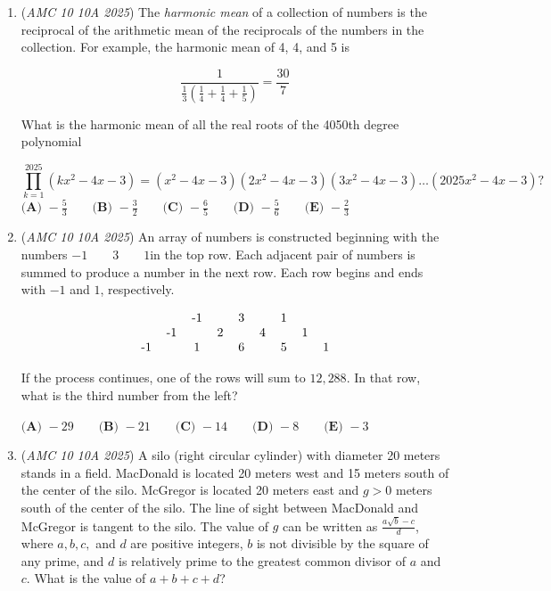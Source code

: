 \begin{enumerate}
 $\textbf{(A) } 0 \qquad\textbf{(B) } 1 \qquad\textbf{(C) } 2 \qquad\textbf{(D) } 3 \qquad\textbf{(E) } 4$


	\item (\textit{AMC 10 10A 2025}) The \textit{harmonic mean} of a collection of numbers is the reciprocal of the arithmetic mean of the reciprocals of the numbers in the collection. For example, the harmonic mean of 4, 4, and 5 is 


 
 \[\frac{1}{\frac{1}{3}(\frac{1}{4}+\frac{1}{4}+\frac{1}{5})}=\frac{30}{7}\]


 What is the harmonic mean of all the real roots of the 4050th degree polynomial


 
 \[\prod_{k=1}^{2025} (kx^2-4x-3) = (x^2-4x-3)(2x^2-4x-3)(3x^2-4x-3)\dots (2025x^2-4x-3) ?\]
$\textbf{(A) } -\frac{5}{3} \qquad\textbf{(B) } -\frac{3}{2} \qquad\textbf{(C) } -\frac{6}{5} \qquad\textbf{(D) } -\frac{5}{6} \qquad\textbf{(E) } -\frac{2}{3}$


	\item (\textit{AMC 10 10A 2025}) An array of numbers is constructed beginning with the numbers 
$-1\qquad3\qquad1$in the top row. Each adjacent pair of numbers is summed to produce a number in the next row. Each row begins and ends with 
$-1$ and $1$, respectively.


 
 \[\begin{tabular}{ccccccccc} &&-1&&3&&1&&\\ &-1&&2&&4&&1&\\ -1&&1&&6&&5&&1\\ \end{tabular}\]


 If the process continues, one of the rows will sum to $12,288$. In that row, what is the third number from the left?


 $\textbf{(A) } -29 \qquad\textbf{(B) } -21 \qquad\textbf{(C) } -14 \qquad\textbf{(D) } -8 \qquad\textbf{(E) } -3$


	\item (\textit{AMC 10 10A 2025}) A silo (right circular cylinder) with diameter 20 meters stands in a field. MacDonald is located 20 meters west and 15 meters south of the center of the silo. McGregor is located 20 meters east and $g > 0$ meters south of the center of the silo. The line of sight between MacDonald and McGregor is tangent to the silo. The value of $g$ can be written as $\frac{a\sqrt{b}-c}{d}$, where $a,b,c,$ and $d$ are positive integers, $b$ is not divisible by the square of any prime, and $d$ is relatively prime to the greatest common divisor of $a$ and $c$. What is the value of $a+b+c+d$?



\end{enumerate}
